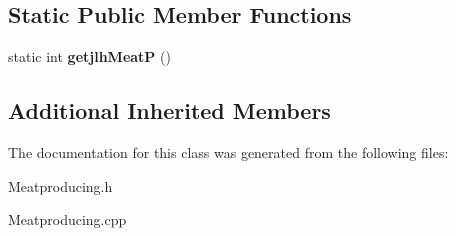 \subsection*{Static Public Member Functions}
\begin{DoxyCompactItemize}
\item 
\mbox{\label{classMeatproducing_ae986adae9c5c2af64a05970dfd0a4665}} 
static int {\bfseries getjlh\+MeatP} ()
\end{DoxyCompactItemize}
\subsection*{Additional Inherited Members}


The documentation for this class was generated from the following files\+:\begin{DoxyCompactItemize}
\item 
Meatproducing.\+h\item 
Meatproducing.\+cpp\end{DoxyCompactItemize}
